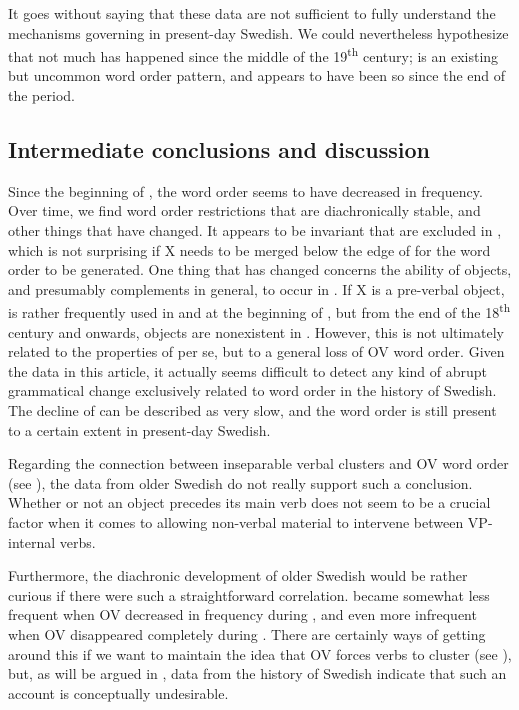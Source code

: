 \documentclass[output=paper, colorlinks, citecolor=brown]{langscibook}
\begin{document}
It goes without saying that these data are not sufficient to fully understand the mechanisms governing  in present-day Swedish. We could nevertheless hypothesize that not much has happened since the middle of the 19\textsuperscript{th} century;  is an existing but uncommon word order pattern, and appears to have been so since the end of the  period.

\subsection{Intermediate conclusions and discussion}\label{sec:sangfelt:4.4}
Since the beginning of , the  word order seems to have decreased in frequency. Over time, we find word order restrictions that are diachronically stable, and other things that have changed. It appears to be invariant that  are excluded in , which is not surprising if X needs to be merged below the edge of  for the word order to be generated. One thing that has changed concerns the ability of objects, and presumably complements in general, to occur in . If X is a pre-verbal object,  is rather frequently used in  and at the beginning of , but from the end of the 18\textsuperscript{th} century and onwards, objects are nonexistent in . However, this is not ultimately related to the properties of  per se, but to a general loss of OV word order. Given the data in this article, it actually seems difficult to detect any kind of abrupt grammatical change exclusively related to  word order in the history of Swedish. The decline of  can be described as very slow, and the word order is still present to a certain extent in present-day Swedish.


Regarding the connection between inseparable verbal clusters and OV word order (see \citealt[17–19, 33–35]{Haider2010}), the data from older Swedish do not really support such a conclusion. Whether or not an object precedes its main verb does not seem to be a crucial factor when it comes to allowing non-verbal material to intervene between VP-internal verbs.



Furthermore, the diachronic development of older Swedish would be rather curious if there were such a straightforward correlation.  became somewhat less frequent when OV decreased in frequency during , and even more infrequent when OV disappeared completely during . There are certainly ways of getting around this if we want to maintain the idea that OV forces verbs to cluster (see \cites[290–292]{Haider2010}[132–135]{Haider2013}), but, as will be argued in , data from the history of Swedish indicate that such an account is conceptually undesirable.
\end{document}
